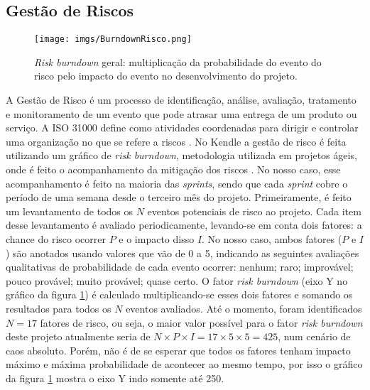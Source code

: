 \documentclass[12pt]{article}
\begin{document}
\subsection{Gestão de Riscos}

\begin{figure}[hbt]
\centering
\texttt{[image: imgs/BurndownRisco.png]}
\caption{{\em Risk burndown} geral: multiplicação da probabilidade do evento do risco pelo impacto do evento no desenvolvimento do projeto.}
\label{fig:riscogeral}
\end{figure}

A Gestão de Risco é um processo de identificação, análise, avaliação, tratamento e monitoramento de um evento que pode atrasar uma entrega de um produto ou serviço. A ISO 31000 define como atividades coordenadas para dirigir e controlar uma organização no que se refere a riscos \cite{purdy2010iso}. No Kendle a gestão de risco  é feita utilizando um gráfico de {\em risk burndown}, metodologia utilizada em projetos ágeis, onde é feito o acompanhamento da mitigação dos riscos \cite{cohn_RiskBurndown_blog2010}.
No nosso caso, esse acompanhamento é feito na maioria das {\em sprints}, sendo que cada {\em sprint} cobre o período de uma semana desde o terceiro mês do projeto.
Primeiramente, é feito um levantamento de todos os $N$ eventos potenciais de risco ao projeto. Cada item desse levantamento é avaliado periodicamente, levando-se em conta dois fatores: a chance do risco ocorrer $P$ e o impacto disso $I$. No nosso caso, ambos fatores ($P$ e $I$) são anotados usando valores que vão de 0 a 5, indicando as seguintes avaliações qualitativas de probabilidade de cada evento ocorrer: nenhum; raro; improvável; pouco provável; 
muito provável; quase certo.
O fator {\em risk burndown} (eixo Y no gráfico da figura \ref{fig:riscogeral}) é calculado multiplicando-se esses dois fatores e somando os resultados para todos os $N$ eventos avaliados.
Até o momento, foram identificados $N=17$ fatores de risco, ou seja, o maior valor possível para o fator {\em risk burndown} deste projeto atualmente seria de $N \times P \times I = 17 \times 5 \times 5 = 425$, num cenário de caos absoluto.
Porém, não é de se esperar que todos os fatores tenham impacto máximo e máxima probabilidade de acontecer ao mesmo tempo, por isso o gráfico da figura \ref{fig:riscogeral} mostra o eixo Y indo somente até 250.
\end{document}
